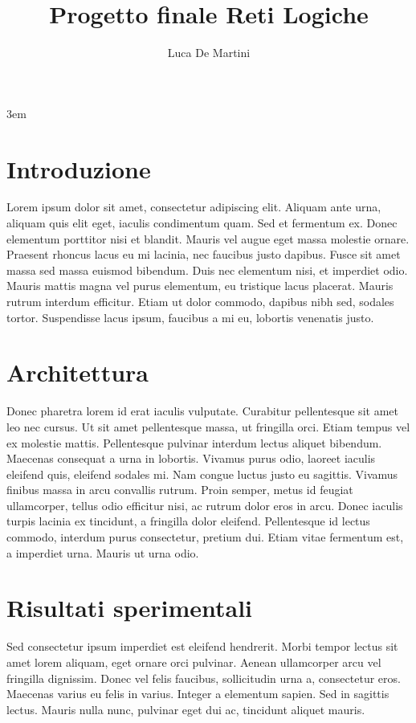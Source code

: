 \documentclass[a4paper,twocolumn]{article}
\title{Progetto finale Reti Logiche}
\author{Luca De Martini}
\date{}
\begin{document}
\emergencystretch 3em

\maketitle
    
\section{Introduzione}
Lorem ipsum dolor sit amet, consectetur adipiscing elit. Aliquam ante urna, aliquam quis elit eget, iaculis condimentum quam. Sed et fermentum ex. Donec elementum porttitor nisi et blandit. Mauris vel augue eget massa molestie ornare. Praesent rhoncus lacus eu mi lacinia, nec faucibus justo dapibus. Fusce sit amet massa sed massa euismod bibendum. Duis nec elementum nisi, et imperdiet odio. Mauris mattis magna vel purus elementum, eu tristique lacus placerat. Mauris rutrum interdum efficitur. Etiam ut dolor commodo, dapibus nibh sed, sodales tortor. Suspendisse lacus ipsum, faucibus a mi eu, lobortis venenatis justo.
\section{Architettura}
Donec pharetra lorem id erat iaculis vulputate. Curabitur pellentesque sit amet leo nec cursus. Ut sit amet pellentesque massa, ut fringilla orci. Etiam tempus vel ex molestie mattis. Pellentesque pulvinar interdum lectus aliquet bibendum. Maecenas consequat a urna in lobortis. Vivamus purus odio, laoreet iaculis eleifend quis, eleifend sodales mi. Nam congue luctus justo eu sagittis. Vivamus finibus massa in arcu convallis rutrum. Proin semper, metus id feugiat ullamcorper, tellus odio efficitur nisi, ac rutrum dolor eros in arcu. Donec iaculis turpis lacinia ex tincidunt, a fringilla dolor eleifend. Pellentesque id lectus commodo, interdum purus consectetur, pretium dui. Etiam vitae fermentum est, a imperdiet urna. Mauris ut urna odio.
\section{Risultati sperimentali}
Sed consectetur ipsum imperdiet est eleifend hendrerit. Morbi tempor lectus sit amet lorem aliquam, eget ornare orci pulvinar. Aenean ullamcorper arcu vel fringilla dignissim. Donec vel felis faucibus, sollicitudin urna a, consectetur eros. Maecenas varius eu felis in varius. Integer a elementum sapien. Sed in sagittis lectus. Mauris nulla nunc, pulvinar eget dui ac, tincidunt aliquet mauris.
\end{document}
